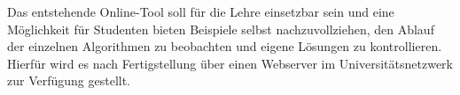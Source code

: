 Das entstehende Online-Tool soll für die Lehre einsetzbar sein und eine Möglichkeit für Studenten bieten Beispiele selbst nachzuvollziehen, den Ablauf der einzelnen Algorithmen zu beobachten und eigene Lösungen zu kontrollieren. Hierfür wird es nach Fertigstellung über einen Webserver im Universitätsnetzwerk zur Verfügung gestellt. 


